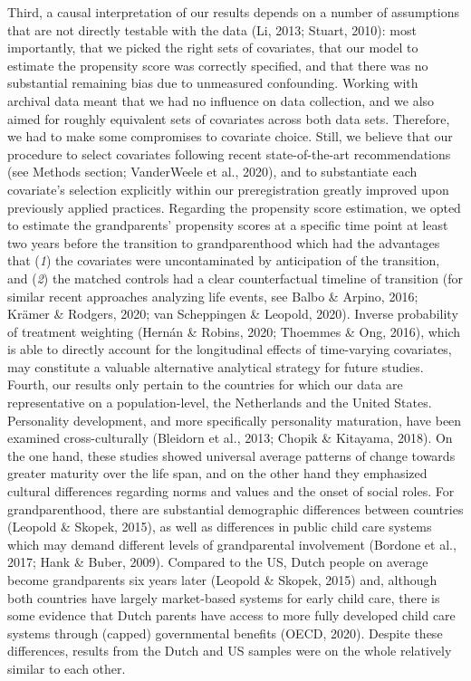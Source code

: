 \documentclass[
  english,
  man, noextraspace]{apa7}
\begin{document}
Third, a causal interpretation of our results depends on a number of assumptions that are not directly testable with the data (Li, 2013; Stuart, 2010): most importantly, that we picked the right sets of covariates, that our model to estimate the propensity score was correctly specified, and that there was no substantial remaining bias due to unmeasured confounding. Working with archival data meant that we had no influence on data collection, and we also aimed for roughly equivalent sets of covariates across both data sets. Therefore, we had to make some compromises to covariate choice. Still, we believe that our procedure to select covariates following recent state-of-the-art recommendations (see Methods section; VanderWeele et al., 2020), and to substantiate each covariate's selection explicitly within our preregistration greatly improved upon previously applied practices. Regarding the propensity score estimation, we opted to estimate the grandparents' propensity scores at a specific time point at least two years before the transition to grandparenthood which had the advantages that (\emph{1}) the covariates were uncontaminated by anticipation of the transition, and (\emph{2}) the matched controls had a clear counterfactual timeline of transition (for similar recent approaches analyzing life events, see Balbo \& Arpino, 2016; Krämer \& Rodgers, 2020; van Scheppingen \& Leopold, 2020). Inverse probability of treatment weighting (Hernán \& Robins, 2020; Thoemmes \& Ong, 2016), which is able to directly account for the longitudinal effects of time-varying covariates, may constitute a valuable alternative analytical strategy for future studies.\\
Fourth, our results only pertain to the countries for which our data are representative on a population-level, the Netherlands and the United States. Personality development, and more specifically personality maturation, have been examined cross-culturally (Bleidorn et al., 2013; Chopik \& Kitayama, 2018). On the one hand, these studies showed universal average patterns of change towards greater maturity over the life span, and on the other hand they emphasized cultural differences regarding norms and values and the onset of social roles. For grandparenthood, there are substantial demographic differences between countries (Leopold \& Skopek, 2015), as well as differences in public child care systems which may demand different levels of grandparental involvement (Bordone et al., 2017; Hank \& Buber, 2009). Compared to the US, Dutch people on average become grandparents six years later (Leopold \& Skopek, 2015) and, although both countries have largely market-based systems for early child care, there is some evidence that Dutch parents have access to more fully developed child care systems through (capped) governmental benefits (OECD, 2020). Despite these differences, results from the Dutch and US samples were on the whole relatively similar to each other.\\
\end{document}
